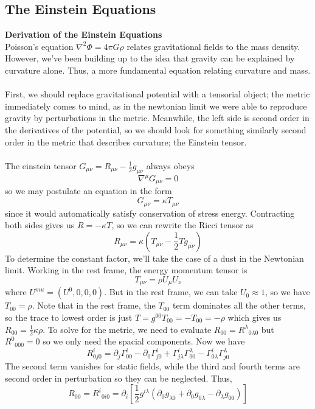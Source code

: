 \documentclass[11pt]{article}
\begin{document}
\subsection{The Einstein Equations}
\textbf{Derivation of the Einstein Equations}
\\
\noindent Poisson's equation \(\nabla^2 \Phi = 4\pi G\rho\) relates gravitational fields to the mass density. However, we've been building up to the idea that gravity can be explained by curvature alone. Thus, a more
fundamental equation relating curvature and mass.
\\
\\
First, we should replace gravitational potential with a tensorial object; the metric immediately comes to mind, as in the newtonian limit we were able to reproduce gravity
by perturbations in the metric. Meanwhile, the left side is second order in the derivatives of the potential, so we should look for something similarly second order in the metric
that describes curvature; the Einstein tensor.
\\
\\
The einstein tensor \(G_{\mu\nu} = R_{\mu\nu} - \frac{1}{2}g_{\mu\nu}\) always obeys 
\[
    \nabla^{\mu}G_{\mu\nu} = 0
\]
so we may postulate an equation in the form
\[
    G_{\mu\nu} = \kappa T_{\mu\nu}
\]
since it would automatically satisfy conservation of stress energy. Contracting both sides gives us \(R = -\kappa T\), so we can rewrite the Ricci tensor as 
\[
    R_{\mu\nu} = \kappa(T_{\mu\nu} - \frac{1}{2}T g_{\mu\nu})
\]
To determine the constant factor, we'll take the case of a dust in the Newtonian limit. Working in the rest frame, the energy momentum tensor is 
\[
    T_{\mu\nu} = \rho U_\mu U_\nu
\]
where \(U^{mu} = (U^0,0,0,0)\). But in the rest frame, we can take \(U_0 \approx 1\), so we have \(T_{0 0} = \rho\). Note that in the rest frame, the \(T_{0 0}\)
term dominates all the other terms, so the trace to lowest order is just \(    T = g^{0 0}T_{0 0} = -T_{0 0} = -\rho\) which gives us \(R_{0 0} = \frac{1}{2}\kappa \rho\). To solve for the metric, we need to evaluate \(R_{0 0} = R^{\lambda}{}_{0\lambda 0}\) but \(R^0{}_{0 0 0 } = 0\)
so we only need the spacial components. Now we have
\[
    R^{i}_{0 j 0} = \partial_j \Gamma^i_{0 0} - \partial_0 \Gamma^i_{j 0} + \Gamma^i_{j \lambda}\Gamma^\lambda_{0 0}- \Gamma^i_{0 \lambda}\Gamma^\lambda_{j 0}
\]
The second term vanishes for static fields, while the third and fourth terms are second order in perturbation so they can be neglected. Thus,
\[
    R_{0 0} = R^i{}_{0 i 0} = \partial_i \left[\frac{1}{2} g^{i \lambda}(\partial_0 g_{\lambda 0} + \partial_0 g_{0 \lambda} - \partial_\lambda g_{0 0})\right]
\]
\end{document}
